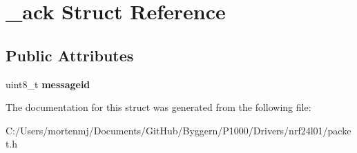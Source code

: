 \hypertarget{struct__ack}{\section{\-\_\-ack Struct Reference}
\label{struct__ack}
}
\subsection*{Public Attributes}
\begin{DoxyCompactItemize}
\item 
\hypertarget{struct__ack_a1f8d96bd4023869b23114f413ddb75ff}{uint8\-\_\-t {\bfseries messageid}}\label{struct__ack_a1f8d96bd4023869b23114f413ddb75ff}

\end{DoxyCompactItemize}


The documentation for this struct was generated from the following file\-:\begin{DoxyCompactItemize}
\item 
C\-:/\-Users/mortenmj/\-Documents/\-Git\-Hub/\-Byggern/\-P1000/\-Drivers/nrf24l01/packet.\-h\end{DoxyCompactItemize}

